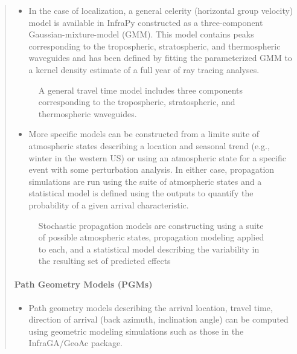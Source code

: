 \documentclass[letterpaper,10pt,english]{sphinxmanual}
\let\sphinxpxdimen\pdfpxdimen\else\newdimen\sphinxpxdimen
\begin{document}
\begin{itemize}
\begin{quote}
\begin{itemize}
\item {} 
In the case of localization, a general celerity (horizontal group velocity) model is available in InfraPy constructed as a three-component Gaussian-mixture-model (GMM).  This model contains peaks corresponding to the tropospheric, stratospheric, and thermospheric waveguides and has been defined by fitting the parameterized GMM to a kernel density estimate of a full year of ray tracing analyses.

\end{itemize}

\begin{figure}[htbp]
\centering
\capstart

\noindent\sphinxincludegraphics[width=500\sphinxpxdimen]{{cel_dist}.jpg}
\caption{A general travel time model includes three components corresponding to the tropospheric, stratospheric, and thermospheric waveguides.}\label{\detokenize{propagation:id1}}\end{figure}
\begin{itemize}
\item {} 
More specific models can be constructed from a limite suite of atmospheric states describing a location and seasonal trend (e.g., winter in the western US) or using an atmospheric state for a specific event with some perturbation analysis.  In either case, propagation simulations are run using the suite of atmospheric states and a statistical model is defined using the outputs to quantify the probability of a given arrival characteristic.

\end{itemize}

\begin{figure}[htbp]
\centering
\capstart

\noindent\sphinxincludegraphics[width=500\sphinxpxdimen]{{stochprop_fig1}.jpg}
\caption{Stochastic propagation models are constructing using a suite of possible atmospheric states, propagation modeling applied to each, and a statistical model describing the variability in the resulting set of predicted effects}\label{\detokenize{propagation:id2}}\end{figure}


\paragraph{Path Geometry Models (PGMs)}
\label{\detokenize{propagation:path-geometry-models-pgms}}\begin{itemize}
\item {} 
Path geometry models describing the arrival location, travel time, direction of arrival (back azimuth, inclination angle) can be computed using geometric modeling simulations such as those in the InfraGA/GeoAc package.


\end{itemize}
\end{quote}
\end{itemize}
\end{document}

